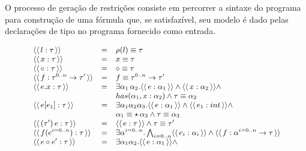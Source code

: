 \documentclass[a4paper,8pt]{article}
\newcommand{\constr}[1]{\ensuremath{\langle\langle\,#1\,\rangle\rangle}}
\begin{document}
     O processo de geração de restrições consiste em percorrer a
     sintaxe do programa para construção de uma fórmula que, se
     satisfazível, seu modelo é dado pelas declarações de tipo
     no programa fornecido como entrada. 

     \begin{figure}[h]
       \[\small{
            \begin{array}{lcl}
                \constr{l : \tau} & = & \rho(l) \equiv \tau\\
                \constr{x : \tau} & = & x \equiv \tau \\
                \constr{\circ : \tau} & = & \circ \equiv \tau \\
                \constr{f : \tau^{0..n}\to \tau'} & = & f \equiv
                                                        \tau^{0..n}\to
                                                        \tau' \\
                \constr{e.x : \tau} & = & \exists
                                          \alpha_1\,\alpha_2. \constr{e
                                          : \alpha_1} \land \constr{x
                                          : \alpha_2} \land \\
                          & & has(\alpha_1,x:\alpha_2) \land \tau
                              \equiv \alpha_2\\
                \constr{e[e_1] : \tau} & = & \exists
                                         \alpha_1\alpha_2\alpha_3. \constr{e:\alpha_1}
                                             \land\constr{e_1: int}\land\\
                         & & \alpha_1\equiv\star\,\alpha_3 \land \tau
                             \equiv\alpha_3\\
                \constr{(\tau')\,e:\tau} & = & \constr{e : \tau} \land
                                               \tau \equiv \tau'\\
                \constr{f(e^{i=0..n}) : \tau} & = & \exists
                                                    \alpha^{i=0..n}. \bigwedge_{i=0..n}\constr{e_i:\alpha_i}
                                                    \land \constr{f :
                                                    \alpha^{i=0..n}
                                                    \to \tau} \\
                     \constr{e \circ e' : \tau} & = & \exists
                                                      \alpha_1\alpha_2.\constr{e
                                                      :\alpha_1} \land

\end{array}}\]
\end{figure}
\end{document}

